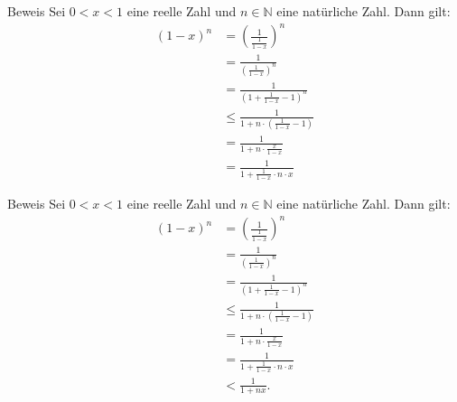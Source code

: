 \documentclass[10pt]{beamer}
\def\bN{\mathbb{N}}
\begin{document}
\begin{frame}{Beweis}
    Sei \( 0 < x < 1 \) eine reelle Zahl und \( n \in \bN \) eine natürliche Zahl. Dann gilt:
    \begin{align*}
        \left( 1 - x \right)^{n} 
        & = \left( \frac{1}{\frac{1}{1 - x}} \right)^{n} \\
        & = \frac{1}{\left( \frac{1}{1 - x} \right)^{n}} \\
        & = \frac{1}{\left( 1 + \frac{1}{1 - x} - 1 \right)^{n}} \\
        & \leq \frac{1}{1 + n \cdot \left( \frac{1}{1 - x} - 1 \right)} \\
        & = \frac{1}{1 + n \cdot \frac{x}{1 - x}} \\
        & = \frac{1}{1 + \frac{1}{1 - x} \cdot n \cdot x}
    \end{align*}
\end{frame}



\begin{frame}{Beweis}
    Sei \( 0 < x < 1 \) eine reelle Zahl und \( n \in \bN \) eine natürliche Zahl. Dann gilt:
    \begin{align*}
        \left( 1 - x \right)^{n} 
        & = \left( \frac{1}{\frac{1}{1 - x}} \right)^{n} \\
        & = \frac{1}{\left( \frac{1}{1 - x} \right)^{n}} \\
        & = \frac{1}{\left( 1 + \frac{1}{1 - x} - 1 \right)^{n}} \\
        & \leq \frac{1}{1 + n \cdot \left( \frac{1}{1 - x} - 1 \right)} \\
        & = \frac{1}{1 + n \cdot \frac{x}{1 - x}} \\
        & = \frac{1}{1 + \frac{1}{1 - x} \cdot n \cdot x} \\
        & < \frac{1}{1 + nx}.
    \end{align*}
\end{frame}
\end{document}
